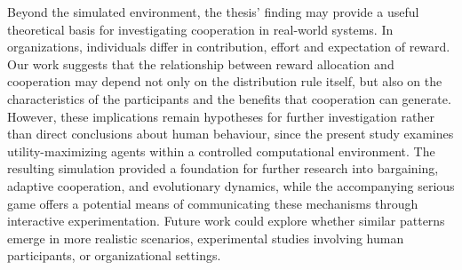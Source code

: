 \documentclass[12pt,a4paper]{report}
\begin{document}
	Beyond the simulated environment, the thesis' finding may provide a useful theoretical basis for investigating cooperation in real-world systems. In organizations, individuals differ in contribution, effort and expectation of reward. Our work suggests that the relationship between reward allocation and cooperation may depend not only on the distribution rule itself, but also on the characteristics of the participants and the benefits that cooperation can generate. However, these implications remain hypotheses for further investigation rather than direct conclusions about human behaviour, since the present study examines utility-maximizing agents within a controlled computational environment. The resulting simulation provided a foundation for further research into bargaining, adaptive cooperation, and evolutionary dynamics, while the accompanying serious game offers a potential means of communicating these mechanisms through interactive experimentation. Future work could explore whether similar patterns emerge in more realistic scenarios, experimental studies involving human participants, or organizational settings.

	
	\printbibliography
	
\end{document}
